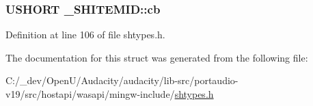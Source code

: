 \subsubsection[{\texorpdfstring{cb}{cb}}]{\setlength{\rightskip}{0pt plus 5cm}U\+S\+H\+O\+RT \+\_\+\+S\+H\+I\+T\+E\+M\+I\+D\+::cb}\hypertarget{struct___s_h_i_t_e_m_i_d_a6c450a3b68d79c1af54a2c489b57ebcb}{}\label{struct___s_h_i_t_e_m_i_d_a6c450a3b68d79c1af54a2c489b57ebcb}


Definition at line 106 of file shtypes.\+h.



The documentation for this struct was generated from the following file\+:\begin{DoxyCompactItemize}
\item 
C\+:/\+\_\+dev/\+Open\+U/\+Audacity/audacity/lib-\/src/portaudio-\/v19/src/hostapi/wasapi/mingw-\/include/\hyperlink{shtypes_8h}{shtypes.\+h}\end{DoxyCompactItemize}
